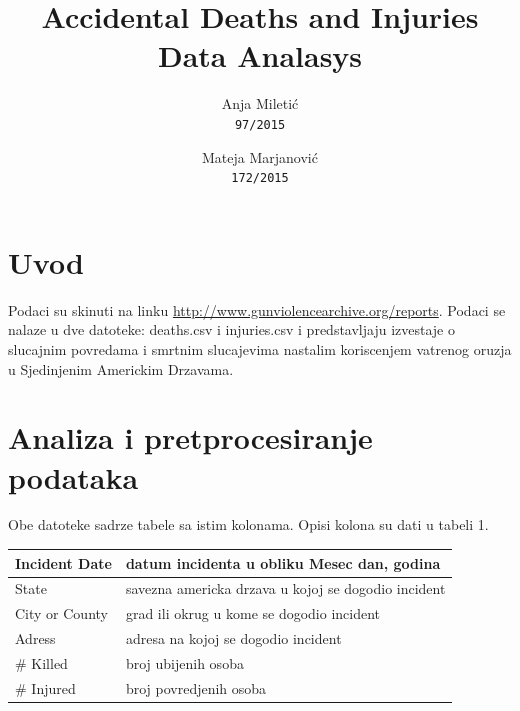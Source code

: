 \documentclass[11pt]{article} %
\title{Accidental Deaths and Injuries Data Analasys}
\author{
Anja Miletić\\
\texttt{97/2015}
\and
Mateja Marjanović\\
\texttt{172/2015}
}
\begin{document}
\maketitle
\newpage

\doublespacing
\tableofcontents
\singlespacing
\newpage


\section{Uvod}
Podaci su skinuti na linku \url{http://www.gunviolencearchive.org/reports}. Podaci se nalaze u dve datoteke: deaths.csv i injuries.csv i predstavljaju izvestaje o 
slucajnim povredama i smrtnim slucajevima nastalim koriscenjem vatrenog oruzja u Sjedinjenim Americkim Drzavama. 

\section{Analiza i pretprocesiranje podataka}
Obe datoteke sadrze tabele sa istim kolonama. Opisi kolona su dati u tabeli 1.
\newline\newline
\begin{tabular}{|l|l|}
\hline
Incident Date & datum incidenta u obliku Mesec dan, godina \\
\hline
State & savezna americka drzava u kojoj se dogodio incident \\
\hline
City or County & grad ili okrug u kome se dogodio incident \\
\hline
Adress & adresa na kojoj se dogodio incident \\
\hline
\# Killed & broj ubijenih osoba \\
\hline
\# Injured & broj povredjenih osoba \\
\hline
\end{tabular}
\end{document}
